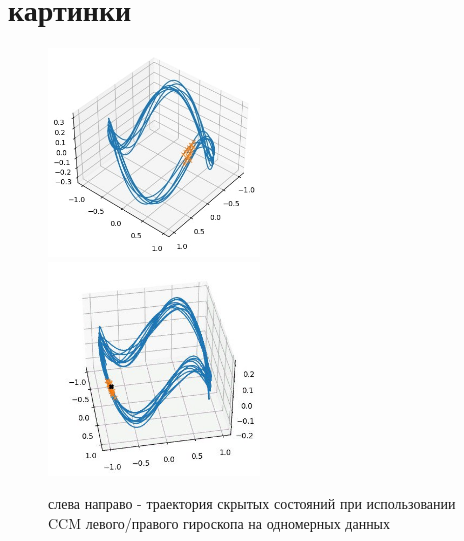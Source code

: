 \documentclass[12pt, twoside]{article}
\begin{document}
\section{картинки}
\begin{figure}[h!]
	\includegraphics[width = 0.5\textwidth]{images/trajectory_CCM.jpg} \hfill
	\includegraphics[width = 0.5\textwidth]{images/trajectory_CCM_right.jpg}
	\caption{слева направо - траектория скрытых состояний при использовании CCM левого/правого гироскопа на одномерных данных}
	\label{trajectory_CCM}
\end{figure}	
\end{document}
